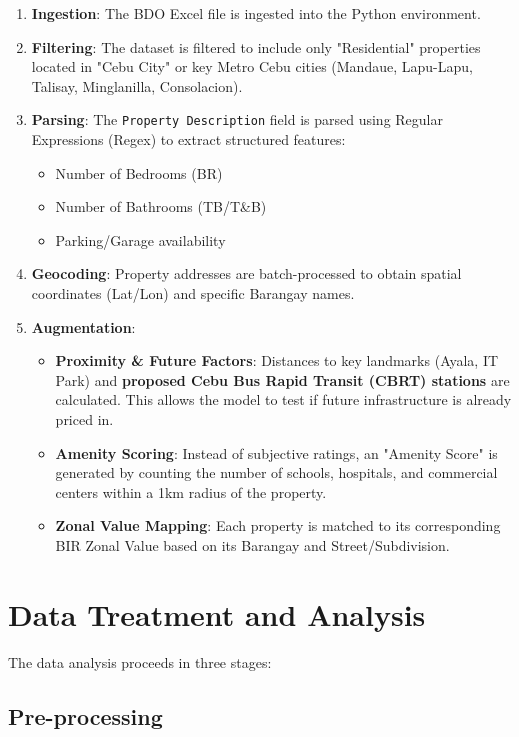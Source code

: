\begin{enumerate}
    \item \textbf{Ingestion}: The BDO Excel file is ingested into the Python environment.
    \item \textbf{Filtering}: The dataset is filtered to include only "Residential" properties located in "Cebu City" or key Metro Cebu cities (Mandaue, Lapu-Lapu, Talisay, Minglanilla, Consolacion).
    \item \textbf{Parsing}: The \texttt{Property Description} field is parsed using Regular Expressions (Regex) to extract structured features:
    \begin{itemize}
        \item Number of Bedrooms (BR)
        \item Number of Bathrooms (TB/T\&B)
        \item Parking/Garage availability
    \end{itemize}
    \item \textbf{Geocoding}: Property addresses are batch-processed to obtain spatial coordinates (Lat/Lon) and specific Barangay names.
    \item \textbf{Augmentation}:
    \begin{itemize}
        \item \textbf{Proximity \& Future Factors}: Distances to key landmarks (Ayala, IT Park) and \textbf{proposed Cebu Bus Rapid Transit (CBRT) stations} are calculated. This allows the model to test if future infrastructure is already priced in.
        \item \textbf{Amenity Scoring}: Instead of subjective ratings, an "Amenity Score" is generated by counting the number of schools, hospitals, and commercial centers within a 1km radius of the property.
        \item \textbf{Zonal Value Mapping}: Each property is matched to its corresponding BIR Zonal Value based on its Barangay and Street/Subdivision.
    \end{itemize}
\end{enumerate}

\section{Data Treatment and Analysis}

The data analysis proceeds in three stages:

\subsection{Pre-processing}


